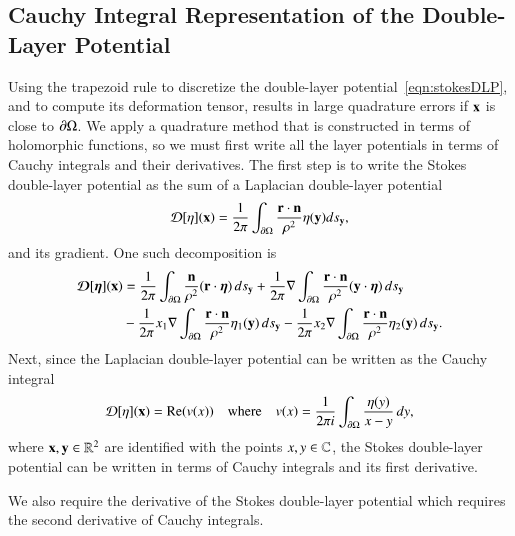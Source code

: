 \documentclass[preprint, 10pt]{elsarticle}
\begin{document}
\subsection{Cauchy Integral Representation of the Double-Layer
Potential}
\label{s:DLPcomplex}
Using the trapezoid rule to discretize the double-layer
potential~\eqref{eqn:stokesDLP}, and to compute its deformation tensor,
results in large quadrature errors if ${\mathbf{x}}$ is close to ${\partial}\Omega$.  We
apply a quadrature method that is constructed in terms of holomorphic
functions, so we must first write all the layer potentials in terms of
Cauchy integrals and their derivatives.  The first step is to write the
Stokes double-layer potential as the sum of a Laplacian double-layer
potential
\begin{align}
  {\mathcal{D}}[\eta]({\mathbf{x}}) = \frac{1}{2\pi} \int_{{\partial}\Omega}
    \frac{{\mathbf{r}} \cdot {\mathbf{n}}}{\rho^2} \eta({\mathbf{y}}) ds_{\mathbf{y}},
\end{align}
and its gradient.  One such decomposition is
\begin{equation}
  \label{eqn:Stokes2Laplace}
  \begin{aligned}
    {\boldsymbol{\mathcal D}}[{\boldsymbol\eta}]({\mathbf{x}}) &= 
      \frac{1}{2\pi} \int_{{\partial}\Omega} 
        \frac{{\mathbf{n}}}{\rho^2} ({\mathbf{r}} \cdot {\boldsymbol\eta}) \, ds_{\mathbf{y}} + 
      \frac{1}{2\pi} \nabla \int_{{\partial}\Omega}
        \frac{{\mathbf{r}} \cdot {\mathbf{n}}}{\rho^2} ({\mathbf{y}} \cdot {\boldsymbol\eta}) \, ds_{\mathbf{y}} \\
      &- \frac{1}{2\pi} x_1 \nabla \int_{{\partial}\Omega}
        \frac{{\mathbf{r}} \cdot {\mathbf{n}}}{\rho^2}\eta_1({\mathbf{y}}) \, ds_{\mathbf{y}} -
      \frac{1}{2\pi} x_2 \nabla \int_{{\partial}\Omega}
        \frac{{\mathbf{r}} \cdot {\mathbf{n}}}{\rho^2}\eta_2({\mathbf{y}}) \, ds_{\mathbf{y}}.
  \end{aligned}
\end{equation}
Next, since the Laplacian double-layer potential can be written as the
Cauchy integral
\begin{align}
  {\mathcal{D}}[\eta]({\mathbf{x}}) = {\operatorname{Re}} (v(x)) \quad \text{where} \quad
  v(x) = \frac{1}{2\pi i} \int_{{\partial}\Omega}
    \frac{\eta(y)}{x - y} \, dy,
  \label{eqn:laplaceComplex}
\end{align}
where ${\mathbf{x}},{\mathbf{y}} \in {\mathbb{R}}^2$ are identified with the points $x,y \in {\mathbb{C}}$,
the Stokes double-layer potential can be written in terms of Cauchy
integrals and its first derivative.  



We also require the derivative of
the Stokes double-layer potential which requires the second derivative
of Cauchy integrals.
\end{document}
